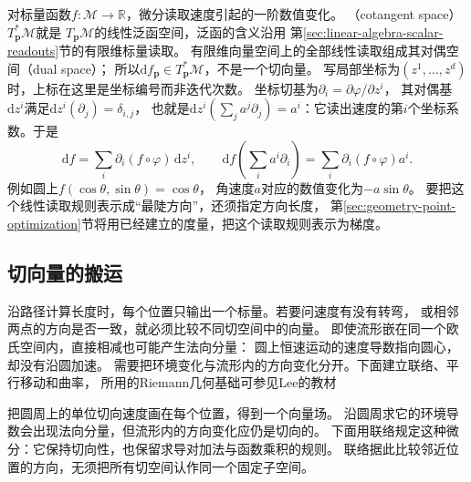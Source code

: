 对标量函数$f:\mathcal M\to\mathbb R$，微分读取速度引起的一阶数值变化。
（cotangent space）$T_{\bm p}^*\mathcal M$就是
$T_{\bm p}\mathcal M$的线性泛函空间，泛函的含义沿用
第\ref{sec:linear-algebra-scalar-readouts}节的有限维标量读取。
有限维向量空间上的全部线性读取组成其对偶空间（dual space）；
所以$\mathrm df_{\bm p}\in T_{\bm p}^*\mathcal M$，不是一个切向量。
写局部坐标为$(z^1,\ldots,z^d)$时，上标在这里是坐标编号而非迭代次数。
坐标切基为$\partial_i=\partial\varphi/\partial z^i$，
其对偶基$\mathrm dz^i$满足$\mathrm dz^i(\partial_j)=\delta_{i,j}$，
也就是$\mathrm dz^i(\sum_j a^j\partial_j)=a^i$：它读出速度的第$i$个坐标系数。于是
\[
 \mathrm df=\sum_i\partial_i(f\circ\varphi)\,\mathrm dz^i,\qquad
 \mathrm df\!\left(\sum_i a^i\partial_i\right)
 =\sum_i\partial_i(f\circ\varphi)a^i.
\]
例如圆上$f(\cos\theta,\sin\theta)=\cos\theta$，
角速度$a$对应的数值变化为$-a\sin\theta$。
要把这个线性读取规则表示成“最陡方向”，还须指定方向长度，
第\ref{sec:geometry-point-optimization}节将用已经建立的度量，把这个读取规则表示为梯度。

\subsection{切向量的搬运}
\label{sec:geometry-tangent-transport}
\label{sec:geometry-connection-comparison}
\label{sec:geometry-riemannian-curvature}

\label{sec:geometry-cross-point-comparison-curvature}
\label{sec:geometry-parallel-transport}

沿路径计算长度时，每个位置只输出一个标量。若要问速度有没有转弯，
或相邻两点的方向是否一致，就必须比较不同切空间中的向量。
即使流形嵌在同一个欧氏空间内，直接相减也可能产生法向分量：
圆上恒速运动的速度导数指向圆心，却没有沿圆加速。
需要把环境变化与流形内的方向变化分开。下面建立联络、平行移动和曲率，
所用的Riemann几何基础可参见Lee的教材


把圆周上的单位切向速度画在每个位置，得到一个向量场。
沿圆周求它的环境导数会出现法向分量，但流形内的方向变化应仍是切向的。
下面用联络规定这种微分：它保持切向性，也保留求导对加法与函数乘积的规则。
联络据此比较邻近位置的方向，无须把所有切空间认作同一个固定子空间。

